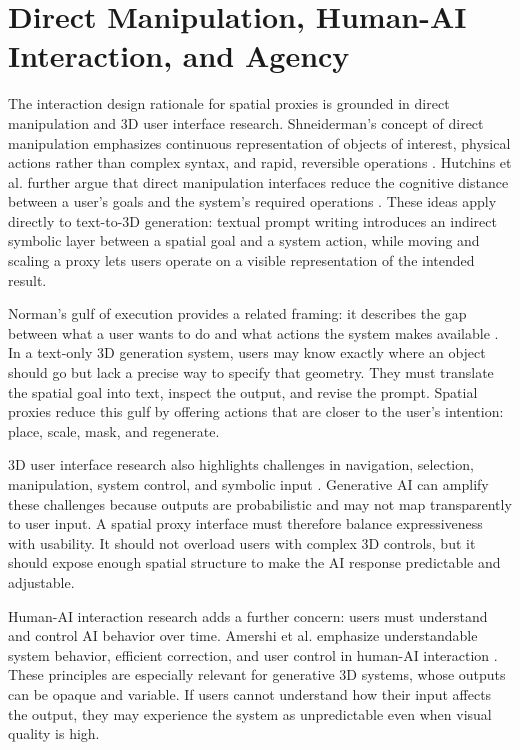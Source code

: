 \documentclass[11pt]{report}
\begin{document}
\section{Direct Manipulation, Human-AI Interaction, and Agency}
\label{sec:rw-direct-manipulation}

The interaction design rationale for spatial proxies is grounded in direct manipulation and 3D user interface research. Shneiderman's concept of direct manipulation emphasizes continuous representation of objects of interest, physical actions rather than complex syntax, and rapid, reversible operations \cite{shneiderman1983direct}. Hutchins et al. further argue that direct manipulation interfaces reduce the cognitive distance between a user’s goals and the system's required operations \cite{hutchins1985direct}. These ideas apply directly to text-to-3D generation: textual prompt writing introduces an indirect symbolic layer between a spatial goal and a system action, while moving and scaling a proxy lets users operate on a visible representation of the intended result.

Norman's gulf of execution provides a related framing: it describes the gap between what a user wants to do and what actions the system makes available \cite{norman1986cognitive}. In a text-only 3D generation system, users may know exactly where an object should go but lack a precise way to specify that geometry. They must translate the spatial goal into text, inspect the output, and revise the prompt. Spatial proxies reduce this gulf by offering actions that are closer to the user’s intention: place, scale, mask, and regenerate.

3D user interface research also highlights challenges in navigation, selection, manipulation, system control, and symbolic input \cite{bowman2017dui}. Generative AI can amplify these challenges because outputs are probabilistic and may not map transparently to user input. A spatial proxy interface must therefore balance expressiveness with usability. It should not overload users with complex 3D controls, but it should expose enough spatial structure to make the AI response predictable and adjustable.

Human-AI interaction research adds a further concern: users must understand and control AI behavior over time. Amershi et al. emphasize understandable system behavior, efficient correction, and user control in human-AI interaction \cite{amershi2019guidelines}. These principles are especially relevant for generative 3D systems, whose outputs can be opaque and variable. If users cannot understand how their input affects the output, they may experience the system as unpredictable even when visual quality is high.
\end{document}
